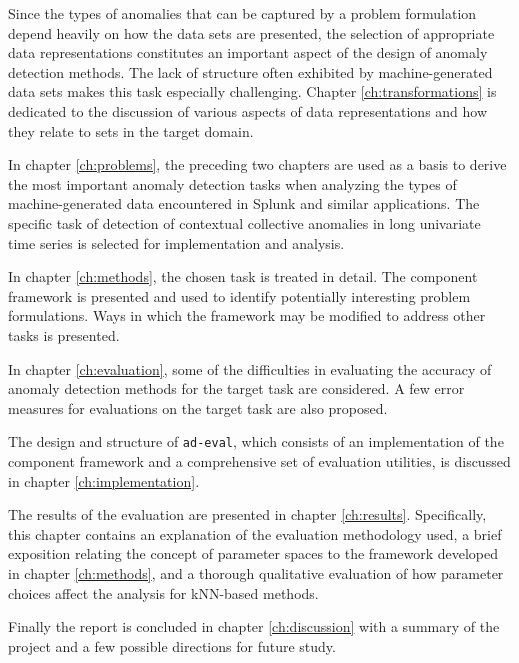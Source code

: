 Since the types of anomalies that can be captured by a problem formulation depend heavily on how the data sets are presented, the selection of appropriate data representations constitutes an important aspect of the design of anomaly detection methods. The lack of structure often exhibited by machine-generated data sets makes this task especially challenging. Chapter \ref{ch:transformations} is dedicated to the discussion of various aspects of data representations and how they relate to sets in the target domain. 

In chapter \ref{ch:problems}, the preceding two chapters are used as a basis to derive the most important anomaly detection tasks when analyzing the types of machine-generated data encountered in Splunk and similar applications. The specific task of detection of contextual collective anomalies in long univariate time series is selected for implementation and analysis.

In chapter \ref{ch:methods}, the chosen task is treated in detail. The component framework is presented and used to identify potentially interesting problem formulations. Ways in which the framework may be modified to address other tasks is presented.

In chapter \ref{ch:evaluation}, some of the difficulties in evaluating the accuracy of anomaly detection methods for the target task are considered. A few error measures for evaluations on the target task are also proposed.

The design and structure of \texttt{ad-eval}, which consists of an implementation of the component framework and a comprehensive set of evaluation utilities, is discussed in chapter \ref{ch:implementation}. 

The results of the evaluation are presented in chapter \ref{ch:results}. Specifically, this chapter contains an explanation of the evaluation methodology used, a brief exposition relating the concept of parameter spaces to the framework developed in chapter \ref{ch:methods}, and a thorough qualitative evaluation of how parameter choices affect the analysis for kNN-based methods. 

Finally the report is concluded in chapter \ref{ch:discussion} with a summary of the project and a few possible directions for future study.
